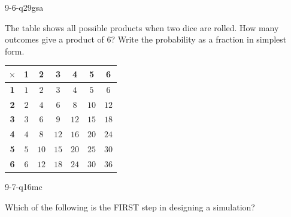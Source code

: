 \begin{practiceQuestion}{9-6-q29}{gsa}
\begin{questionText}
The table shows all possible products when two dice are rolled. How many outcomes give a product of $6$? Write the probability as a fraction in simplest form.

\begin{center}
\begin{tabular}{|c|c|c|c|c|c|c|}
\hline
$\times$ & \textbf{1} & \textbf{2} & \textbf{3} & \textbf{4} & \textbf{5} & \textbf{6} \\
\hline
\textbf{1} & $1$ & $2$ & $3$ & $4$ & $5$ & $6$ \\
\hline
\textbf{2} & $2$ & $4$ & $6$ & $8$ & $10$ & $12$ \\
\hline
\textbf{3} & $3$ & $6$ & $9$ & $12$ & $15$ & $18$ \\
\hline
\textbf{4} & $4$ & $8$ & $12$ & $16$ & $20$ & $24$ \\
\hline
\textbf{5} & $5$ & $10$ & $15$ & $20$ & $25$ & $30$ \\
\hline
\textbf{6} & $6$ & $12$ & $18$ & $24$ & $30$ & $36$ \\
\hline
\end{tabular}
\end{center}
\end{questionText}
\end{practiceQuestion}

\begin{practiceQuestion}{9-7-q16}{mc}
\begin{questionText}
Which of the following is the FIRST step in designing a simulation?
\end{questionText}
\end{practiceQuestion}
